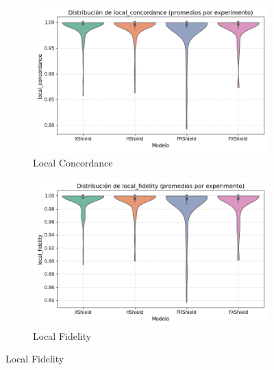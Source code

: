 \begin{figure}[H]
    \centering
    
    \begin{subfigure}[b]{0.45\textwidth}
        \includegraphics[width=\linewidth]{images/boxplot_local_concordance.png}
        \caption{Local Concordance}
    \end{subfigure}
    \hfill
    \begin{subfigure}[b]{0.45\textwidth}
        \includegraphics[width=\linewidth]{images/boxplot_local_fidelity.png}
        \caption{Local Fidelity}
    \end{subfigure}    
    

\end{figure}
